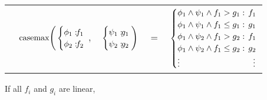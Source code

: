 {\footnotesize
\begin{center}
\begin{tabular}{r c c c l}
&
\hspace{-7mm} $\casemax \Bigg(
  \begin{cases}
    \phi_1: \hspace{-2mm} & \hspace{-2mm} f_1 \\ 
    \phi_2: \hspace{-2mm} & \hspace{-2mm} f_2 \\ 
  \end{cases}$
$,$
&
\hspace{-4mm}
  $\begin{cases}
    \psi_1: \hspace{-2mm} & \hspace{-2mm} g_1 \\ 
    \psi_2: \hspace{-2mm} & \hspace{-2mm} g_2 \\ 
  \end{cases} \Bigg)$
&
\hspace{-4mm} 
$ = $
&
\hspace{-4mm}
  $\begin{cases}
  \phi_1 \wedge \psi_1 \wedge f_1 > g_1    : & \hspace{-2mm} f_1 \\ 
  \phi_1 \wedge \psi_1 \wedge f_1 \leq g_1 : & \hspace{-2mm} g_1 \\ 
  \phi_1 \wedge \psi_2 \wedge f_1 > g_2    : & \hspace{-2mm}f_1 \\ 
  \phi_1 \wedge \psi_2 \wedge f_1 \leq g_2 : & \hspace{-2mm} g_2 \\ 
  \vdots & \vdots
  \end{cases}$
\end{tabular}
\end{center}
} If all $f_i$ and $g_i$ are linear,
